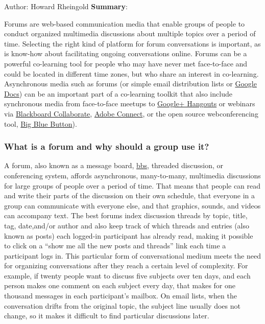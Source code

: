 Author: Howard Rheingold \textbf{Summary}:

Forums are web-based communication media that enable groups of people to
conduct organized multimedia discussions about multiple topics over a
period of time. Selecting the right kind of platform for forum
conversations is important, as is know-how about facilitating ongoing
conversations online. Forums can be a powerful co-learning tool for
people who may have never met face-to-face and could be located in
different time zones, but who share an interest in co-learning.
Asynchronous media such as forums (or simple email distribution lists or
\href{http://www.youtube.com/watch?v=VVFbqHhkb-k}{Google Docs}) can be
an important part of a co-learning toolkit that also include synchronous
media from face-to-face meetups to
\href{http://www.google.com/+/learnmore/hangouts/}{Google+ Hangouts} or
webinars via
\href{http://www.blackboard.com/Platforms/Collaborate/Products/Blackboard-Collaborate.aspx}{Blackboard
Collaborate},
\href{http://www.adobe.com/products/adobeconnect.html}{Adobe Connect},
or the open source webconferencing tool,
\href{http://www.bigbluebutton.org/}{Big Blue Button}).

\subsubsection{What is a forum and why should a group use it?}

A forum, also known as a message board,
\href{http://en.wikipedia.org/wiki/Bulletin\_board\_system}{bbs},
threaded discussion, or conferencing system, affords asynchronous,
many-to-many, multimedia discussions for large groups of people over a
period of time. That means that people can read and write their parts of
the discussion on their own schedule, that everyone in a group can
communicate with everyone else, and that graphics, sounds, and videos
can accompany text. The best forums index discussion threads by topic,
title, tag, date,and/or author and also keep track of which threads and
entries (also known as posts) each logged-in participant has already
read, making it possible to click on a ``show me all the new posts and
threads'' link each time a participant logs in. This particular form of
conversational medium meets the need for organizing conversations after
they reach a certain level of complexity. For example, if twenty people
want to discuss five subjects over ten days, and each person makes one
comment on each subject every day, that makes for one thousand messages
in each participant's mailbox. On email lists, when the conversation
drifts from the original topic, the subject line usually does not
change, so it makes it difficult to find particular discussions later.

